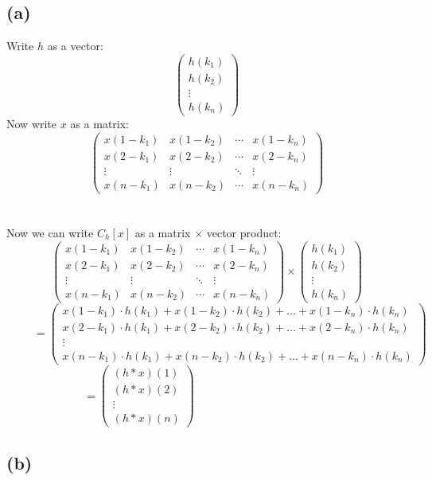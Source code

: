 \documentclass[12pt]{article}
\begin{document}
\subsection*{(a)}
Write $h$ as a vector:
\[
\begin{pmatrix}
h(k_{1})\\
h(k_{2})\\
\vdots\\
h(k_{n})
\end{pmatrix}
\]
Now write $x$ as a matrix:
\[
\begin{pmatrix}
x(1-k_{1}) & x(1-k_{2}) & \cdots & x(1-k_{n})\\
x(2-k_{1}) & x(2-k_{2}) & \cdots & x(2-k_{n})\\
\vdots & \vdots & \ddots & \vdots\\
x(n-k_{1}) & x(n-k_{2}) & \cdots & x(n-k_{n})
\end{pmatrix}
\]
\\\\Now we can write $C_{h}[x]$ as a matrix $\times$ vector product:
\[
\begin{pmatrix}
x(1-k_{1}) & x(1-k_{2}) & \cdots & x(1-k_{n})\\
x(2-k_{1}) & x(2-k_{2}) & \cdots & x(2-k_{n})\\
\vdots & \vdots & \ddots & \vdots\\
x(n-k_{1}) & x(n-k_{2}) & \cdots & x(n-k_{n})
\end{pmatrix} \times \begin{pmatrix}
h(k_{1})\\
h(k_{2})\\
\vdots\\
h(k_{n})
\end{pmatrix}
\]
\[
~~~~~~~~~~~= \begin{pmatrix}
x(1-k_{1}) \cdot h(k_{1}) + x(1-k_{2}) \cdot h(k_{2}) + \ldots + x(1-k_{n}) \cdot h(k_{n})\\
x(2-k_{1}) \cdot h(k_{1}) + x(2-k_{2}) \cdot h(k_{2}) + \ldots + x(2-k_{n}) \cdot h(k_{n})\\
\vdots\\
x(n-k_{1}) \cdot h(k_{1}) + x(n-k_{2}) \cdot h(k_{2}) + \ldots + x(n-k_{n}) \cdot h(k_{n})
\end{pmatrix}
\]
\[
= \begin{pmatrix}
(h*x)(1)\\
(h*x)(2)\\
\vdots\\
(h*x)(n)
\end{pmatrix}~~~~~~~~~~~~~~~~~~~~~~~~~~~~~~~~~~~~~~~~~~~~~~~~~~~~~~~
\]

\subsection*{(b)}
\end{document}
